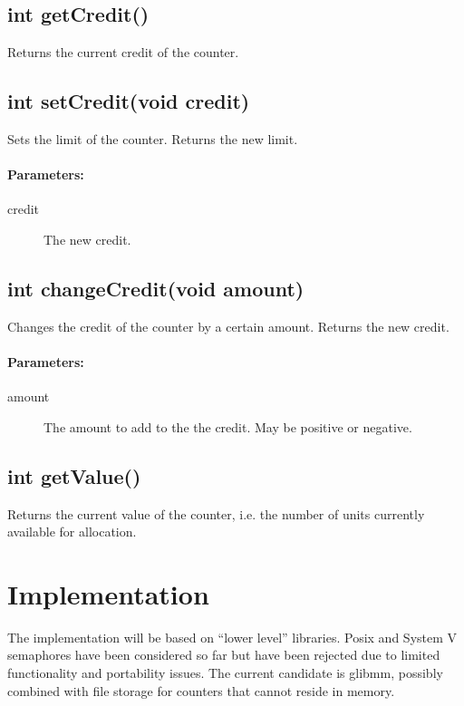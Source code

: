 \documentclass[a4paper,11pt]{article}
\begin{document}
\subsection{int getCredit()}

Returns the current credit of the counter.

\subsection{int setCredit(void credit)}

Sets the limit of the counter. Returns the new limit.

\paragraph{Parameters:}
\begin{description}
\item[credit] The new credit.
\end{description}

\subsection{int changeCredit(void amount)}

Changes the credit of the counter by a certain amount. Returns the new
credit.

\paragraph{Parameters:}
\begin{description}
\item[amount] The amount to add to the the credit. May be positive or
  negative.
\end{description}

\subsection{int getValue()}

Returns the current value of the counter, i.e. the number of units
currently available for allocation.


\section{Implementation}

The implementation will be based on ``lower level'' libraries. Posix
and System V semaphores have been considered so far but have been
rejected due to limited functionality and portability issues. The
current candidate is glibmm, possibly combined with file storage for
counters that cannot reside in memory.
\end{document}
